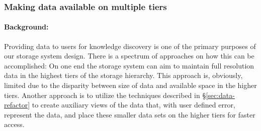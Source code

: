 
\subsubsection*{Making data available on multiple tiers}
\label{sec:manag-data-mult}

\paragraph{Background:} Providing data to users for knowledge discovery is
one of the primary purposes of our storage system design. There is a
spectrum of approaches on how
this can be accomplished: On one end the storage system can aim to maintain
full resolution data in the highest tiers of the storage hierarchy. This
approach is, obviously, limited due to the disparity between size of data
and available space in the higher tiers. Another approach is to utilize the
techniques described in \S\ref{sec:data-refactor} to create auxiliary views of
the data that, with user defined error, represent the data, and place these
smaller data sets on the higher tiers for faster access. 

